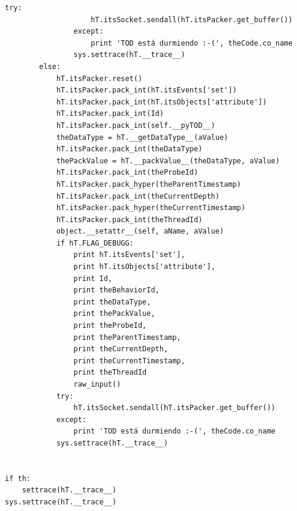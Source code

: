 \documentclass[12pt,legalpaper]{report}
\begin{document}
\begin{singlespace}
\begin{lstlisting}[style=Python]
                try:
                    hT.itsSocket.sendall(hT.itsPacker.get_buffer())
                except:
                    print 'TOD está durmiendo :-(', theCode.co_name   
                sys.settrace(hT.__trace__)
        else:
            hT.itsPacker.reset()
            hT.itsPacker.pack_int(hT.itsEvents['set'])
            hT.itsPacker.pack_int(hT.itsObjects['attribute'])
            hT.itsPacker.pack_int(Id)
            hT.itsPacker.pack_int(self.__pyTOD__)
            theDataType = hT.__getDataType__(aValue)
            hT.itsPacker.pack_int(theDataType)
            thePackValue = hT.__packValue__(theDataType, aValue)
            hT.itsPacker.pack_int(theProbeId)
            hT.itsPacker.pack_hyper(theParentTimestamp)        
            hT.itsPacker.pack_int(theCurrentDepth)
            hT.itsPacker.pack_hyper(theCurrentTimestamp)
            hT.itsPacker.pack_int(theThreadId)
            object.__setattr__(self, aName, aValue)
            if hT.FLAG_DEBUGG:
                print hT.itsEvents['set'],
                print hT.itsObjects['attribute'],
                print Id,
                print theBehaviorId,
                print theDataType,
                print thePackValue,
                print theProbeId,
                print theParentTimestamp,
                print theCurrentDepth,
                print theCurrentTimestamp,
                print theThreadId
                raw_input()
            try:
                hT.itsSocket.sendall(hT.itsPacker.get_buffer())
            except:
                print 'TOD está durmiendo :-(', theCode.co_name   
            sys.settrace(hT.__trace__)


if th:
    settrace(hT.__trace__)  
sys.settrace(hT.__trace__)
\end{lstlisting}
\end{singlespace}
\end{document}
